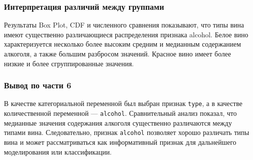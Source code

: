 \subsubsection*{Интерпретация различий между группами}
 
Результаты Box Plot, CDF и численного сравнения показывают, что типы вина имеют существенно различающиеся распределения признака alcohol. Белое вино характеризуется несколько более высоким средним и медианным содержанием алкоголя, а также большим разбросом значений. Красное вино имеет более низкие и более сгруппированные значения.
 
\subsubsection*{Вывод по части 6}
 
В качестве категориальной переменной был выбран признак \texttt{type}, а в качестве количественной переменной — \texttt{alcohol}. Сравнительный анализ показал, что медианные значения содержания алкоголя существенно различаются между типами вина. Следовательно, признак \texttt{alcohol} позволяет хорошо различать типы вина и может рассматриваться как информативный признак для дальнейшего моделирования или классификации.












